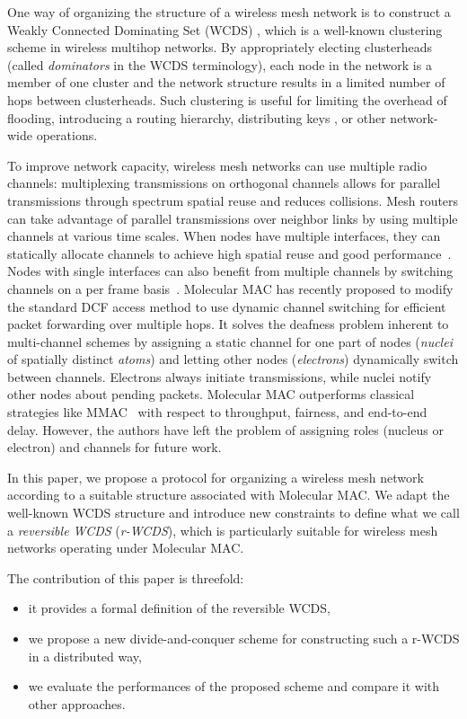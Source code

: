 \documentclass[twoside]{article}
\begin{document}
One way of organizing the structure of a wireless mesh network is to
construct a Weakly Connected Dominating Set (WCDS) \cite{dunbar97},
which is a well-known clustering scheme in wireless multihop
networks. By appropriately electing clusterheads (called
\emph{dominators} in the WCDS terminology), each node in the network
is a member of one cluster and the network structure results in a
limited number of hops between clusterheads. Such clustering is useful
for limiting the overhead of flooding, introducing a routing
hierarchy, distributing keys \cite{pathan06}, or other network-wide
operations.

To improve network capacity, wireless mesh networks can use multiple
radio channels: multiplexing transmissions on orthogonal channels
allows for parallel transmissions through spectrum spatial reuse and
reduces collisions. Mesh routers can take advantage of parallel
transmissions over neighbor links by using multiple channels at
various time scales. When nodes have multiple interfaces, they can
statically allocate channels to achieve high spatial reuse and good
performance~\cite{Raniwala04, Raniwala05, Alichery05,
  Kodialam05}. Nodes with single interfaces can also benefit from
multiple channels by switching channels on a per frame
basis~\cite{so04,bahl04}. Molecular MAC \cite{molecular09rr} has
recently proposed to modify the standard \ieee DCF access method to
use dynamic channel switching for efficient packet forwarding over
multiple hops. It solves the deafness problem inherent to
multi-channel schemes by assigning a static channel for one part of
nodes ({\em nuclei} of spatially distinct {\em atoms}) and letting
other nodes ({\em electrons}) dynamically switch between
channels. Electrons always initiate transmissions, while nuclei notify
other nodes about pending packets. Molecular MAC outperforms classical
strategies like MMAC~\cite{so04} with respect to throughput, fairness,
and end-to-end delay. However, the authors have left the problem of
assigning roles (nucleus or electron) and channels for future
work.

In this paper, we propose a protocol for organizing a wireless mesh
network according to a suitable structure associated with Molecular
MAC. We adapt the well-known WCDS structure and introduce new
constraints to define what we call a \emph{reversible WCDS}
(\emph{r-WCDS}), which is particularly suitable for wireless mesh
networks operating under Molecular MAC.

The contribution of this paper is threefold:
\begin{itemize}
	\item it provides a formal definition of the reversible WCDS,
	\item we propose a new divide-and-conquer scheme for constructing such a r-WCDS in a distributed way, 
	\item we evaluate the performances of the proposed scheme and compare it with other approaches.
\end{itemize}
\end{document}
